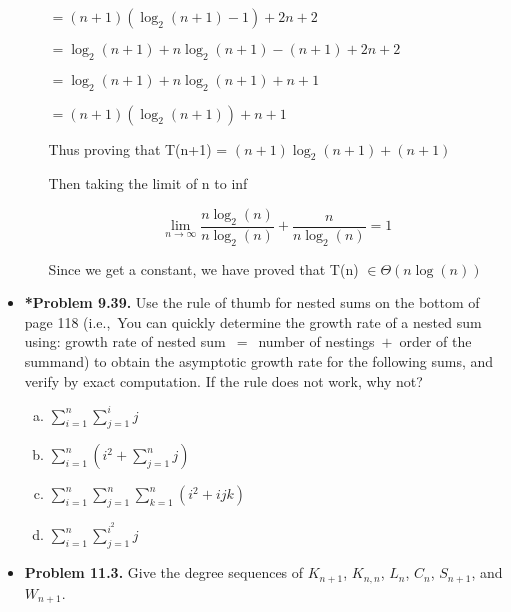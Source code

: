 \documentclass[11pt]{article}
\begin{document}
\begin{itemize}
\begin{enumerate}[(a)]
$= (n+1)(\log_2(n+1) - 1) + 2n + 2$

$= \log_2(n+1) + n\log_2(n+1) - (n+1) + 2n + 2$

$= \log_2(n+1) + n\log_2(n+1) +n + 1$

$= (n+1)(\log_2(n+1))+n+1$

Thus proving that T(n+1) = $(n+1)\log_2(n+1) + (n+1)$

Then taking the limit of n to inf

\[
  \lim_{{n \to \infty}} \frac{n\log_2(n)}{n\log_2(n)} + \frac{n}{n\log_2(n)} = 1
\]

Since we get a constant, we have proved that T(n) $\in \Theta(n\log(n))$ 




\end{enumerate}

\newpage

\item \textbf{*Problem 9.39.}
Use the rule of thumb for nested sums on the bottom of page 118
(i.e.,~You can quickly determine the growth rate of a nested sum using:
growth rate of nested sum~$=$~number of nestings~$+$~order of the summand)
to obtain the asymptotic growth rate for the following sums, and verify by exact computation.
If the rule does not work, why not?
\begin{multicols}{2}
\begin{enumerate}[(a)]
\item $\displaystyle \sum_{i=1}^n \sum_{j=1}^i j$
\item $\displaystyle \sum_{i=1}^n ( i^2 + \sum_{j=1}^n j )$
\item $\displaystyle \sum_{i=1}^n \sum_{j=1}^n \sum_{k=1}^n (i^2+ijk)$
\item $\displaystyle \sum_{i=1}^n \sum_{j=1}^{i^2} j$
\end{enumerate}
\end{multicols}

\vspace{0.1in}

%

%

\item \textbf{Problem 11.3.}
Give the degree sequences of $K_{n+1}$, $K_{n,n}$, $L_n$, $C_n$, $S_{n+1}$, and $W_{n+1}$.


\end{itemize}
\end{document}

